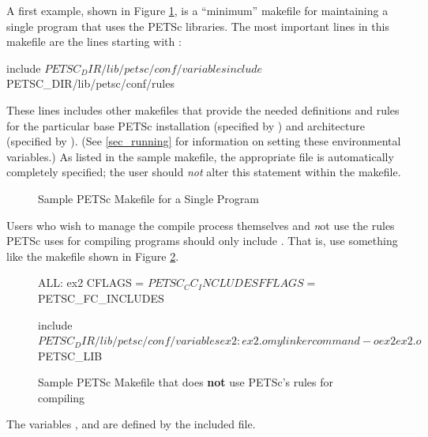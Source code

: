 {{A first example, shown in Figure \ref{fig_make1}, is a ``minimum'' makefile for maintaining
a single program that uses the PETSc libraries.
The most important lines in this makefile are the lines starting with :
\begin{makelisting}
include ${PETSC_DIR}/lib/petsc/conf/variables
include ${PETSC_DIR}/lib/petsc/conf/rules
\end{makelisting}
These lines includes other makefiles that provide the needed definitions
and rules for the particular base PETSc installation (specified by
) and architecture (specified by
).  (See \ref{sec_running} for information on
setting these environmental variables.)  As listed in the sample
makefile, the appropriate  file is automatically
completely specified; the user should {\em not} alter this statement
within the makefile.

\begin{figure}[H]
\caption{Sample PETSc Makefile for a Single Program}
\label{fig_make1}
\end{figure}

Users who wish to manage the compile process themselves
and {\emph not} use the rules PETSc uses for compiling programs
should only include . That is, use something like
the makefile shown in Figure \ref{fig_make1var}.

\begin{figure}[H]
\begin{makelisting}
   ALL: ex2
   CFLAGS   = ${PETSC_CC_INCLUDES}
   FFLAGS   = ${PETSC_FC_INCLUDES}

   include ${PETSC_DIR}/lib/petsc/conf/variables

   ex2: ex2.o
           mylinkercommand -o ex2 ex2.o  ${PETSC_LIB}
\end{makelisting}
\caption{Sample PETSc Makefile that does {\bf not} use PETSc's rules for compiling}
\label{fig_make1var}
\end{figure}

The variables , 
and  are defined by the included  file.

}}
